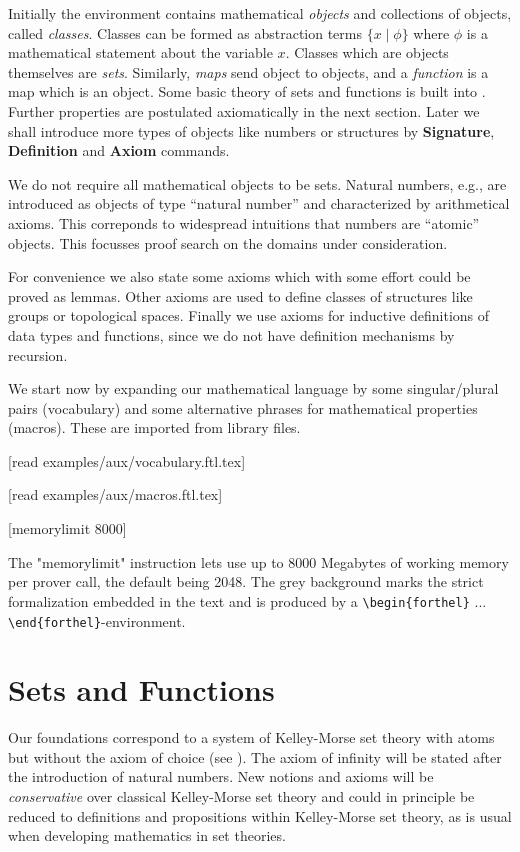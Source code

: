 \documentclass[english,11pt]{article}
\begin{document}
Initially the environment contains 
mathematical \textit{objects} and collections of objects, called \textit{classes}. Classes can
be formed as abstraction terms $\{x\mid\phi\}$ where $\phi$ is a mathematical
statement about the variable $x$. Classes which are objects themselves are 
\textit{sets}. Similarly, \textit{maps} send object to objects, and a \textit{function}
is a map which is an object.
Some basic theory of sets and functions is built into \Naproche{}. Further properties
are postulated axiomatically in the next section. Later we shall introduce more types 
of objects like numbers or structures 
by \textbf{Signature}, \textbf{Definition} and \textbf{Axiom} commands.

We do not require all mathematical objects to be sets. Natural numbers, e.g., are introduced as objects
of type ``natural number'' and characterized by arithmetical axioms. This correponds to
widespread intuitions that numbers are ``atomic'' objects.
This focusses proof search on the domains under
consideration.

For convenience we also state some axioms which with some effort could be proved as lemmas. 
Other axioms are used to define classes of structures like groups or 
topological spaces. Finally we use axioms for inductive definitions
of data types and functions, since we do not have
definition mechanisms by recursion.

We start now by expanding our mathematical language by some
singular/plural pairs (vocabulary) and some alternative phrases 
for mathematical properties (macros). These are imported from
library files.


\begin{forthel}

[read examples/aux/vocabulary.ftl.tex]

[read examples/aux/macros.ftl.tex]

[memorylimit 8000]

\end{forthel}
%
The "memorylimit" instruction lets \Naproche{} use up to 8000 Megabytes of working memory per prover
call, the default being 2048.
The grey background marks the strict formalization
embedded in the text and is produced by
a
\verb+\+\verb+begin{forthel}+ ...
\verb+\+\verb+end{forthel}+-environment.


\section{Sets and Functions}
Our foundations correspond to a system of Kelley-Morse set theory with atoms 
but without the axiom of choice 
(see \cite{Kelley1975}). The axiom of infinity will be stated after
the introduction of natural numbers.
New notions and axioms will be \textit{conservative} over classical Kelley-Morse set theory and 
could in principle be reduced to definitions and propositions within
Kelley-Morse set theory, as is usual when developing mathematics in set theories.
\end{document}
